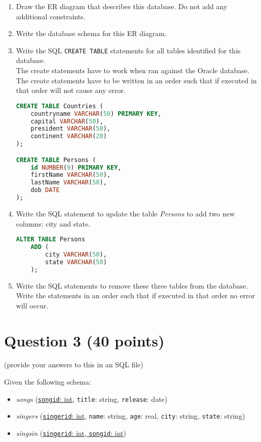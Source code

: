 \documentclass[letterpaper, 11pt]{article}
\begin{document}
\begin{enumerate}[label={\alph*})]
    \item Draw the ER diagram that describes this database. Do not add any additional constraints.
    \item Write the database schema for this ER diagram.
    \item Write the SQL \texttt{CREATE TABLE} statements for all tables identified for this database.\\
    The create statements have to work when ran against the Oracle database.\\
    The create statements have to be written in an order such that if executed in that order will not cause any error.

    \begin{lstlisting}[language=SQL]
CREATE TABLE Countries (
    countryname VARCHAR(50) PRIMARY KEY,
    capital VARCHAR(50),
    president VARCHAR(50),
    continent VARCHAR(20)
);

CREATE TABLE Persons (
    id NUMBER(9) PRIMARY KEY,
    firstName VARCHAR(50),
    lastName VARCHAR(50),
    dob DATE
);
    \end{lstlisting}
    
    \item Write the SQL statement to update the table \textit{Persons} to add two new columns: city and state.

    \begin{lstlisting}[language=SQL]
ALTER TABLE Persons
    ADD (
        city VARCHAR(50),
        state VARCHAR(50)
    );
    \end{lstlisting}
    
    \item Write the SQL statements to remove these three tables from the database. Write the statements in an order such that if executed in that order no error will occur.
\end{enumerate}

\section*{Question 3 (40 points)}

(provide your answers to this in an SQL file)

Given the following schema:
\begin{itemize}
    \item \textit{songs} (\underline{\texttt{songid}: int}, \texttt{title}: string, \texttt{release}: date)
    \item \textit{singers} (\underline{\texttt{singerid}: int}, \texttt{name}: string, \texttt{age}: real, \texttt{city}: string, \texttt{state}: string)
    \item \textit{singsin} (\underline{\texttt{singerid}: int, \texttt{songid}: int})
\end{itemize}
\end{document}
